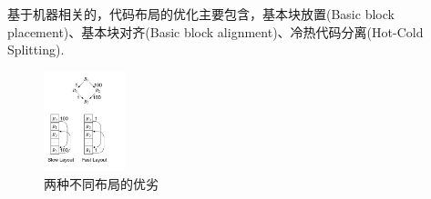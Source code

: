 
基于机器相关的，代码布局的优化主要包含，基本块放置(Basic block placement)、基本块对齐(Basic block alignment)、冷热代码分离(Hot-Cold Splitting)\cite{bakhvalov-2019}.
\begin{figure}
    \centering
    \includegraphics[width=0.21\textwidth]{images/layout_compare.png}
    \caption{两种不同布局的优劣\cite{cooper2011engineering}}
\end{figure}
